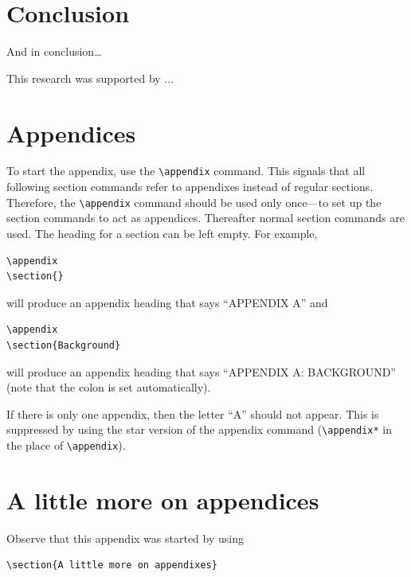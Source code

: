 \documentclass[reprint,NumberedRefs]{JASAnew}
\begin{document}
\section{\label{sec:5}Conclusion}

And in conclusion\ldots

\begin{acknowledgments}
This research was supported by  ...
\end{acknowledgments}




\appendix
\section{Appendices}
To start the appendix, use the \verb+\appendix+ command.
This signals that all following section commands refer to appendixes
instead of regular sections. Therefore, the \verb+\appendix+ command
should be used only once---to set up the section commands to act as
appendices. Thereafter normal section commands are used. The heading
for a section can be left empty. For example,
\begin{verbatim}
\appendix
\section{}
\end{verbatim}
will produce an appendix heading that says ``APPENDIX A'' and
\begin{verbatim}
\appendix
\section{Background}
\end{verbatim}
will produce an appendix heading that says ``APPENDIX A: BACKGROUND''
(note that the colon is set automatically).

If there is only one appendix, then the letter ``A'' should not
appear. This is suppressed by using the star version of the appendix
command (\verb+\appendix*+ in the place of \verb+\appendix+).
\vskip12pt
\vskip1sp
\section{A little more on appendices}

Observe that this appendix was started by using
\begin{verbatim}
\section{A little more on appendixes}
\end{verbatim}
\end{document}
